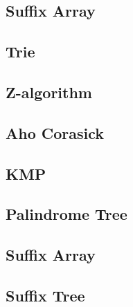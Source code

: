 \subsection{Suffix Array}
\raggedbottom
\hrulefill
\subsection{Trie}
\raggedbottom
\hrulefill
\subsection{Z-algorithm}
\raggedbottom
\hrulefill
\subsection{Aho Corasick}
\raggedbottom
\hrulefill
\subsection{KMP}
\raggedbottom
\hrulefill
\subsection{Palindrome Tree}
\raggedbottom
\hrulefill
\subsection{Suffix Array}
\raggedbottom
\hrulefill
\subsection{Suffix Tree}
\raggedbottom
\hrulefill

